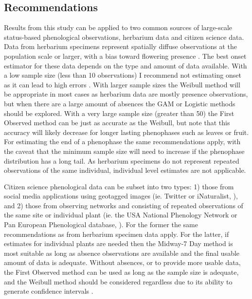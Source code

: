 \subsection{Recommendations}

Results from this study can be applied to two common sources of large-scale status-based phenological observations, herbarium data and citizen science data. Data from herbarium specimens represent spatially diffuse observations at the population scale or larger, with a bias toward flowering presence \citep{willis2017, daru2018}. The best onset estimator for these data depends on the type and amount of data available. With a low sample size (less than 10 observations) I recommend not estimating onset as it can lead to high errors \citep{miller-rushing2008, moussus2010, bertin2015}. With larger sample sizes the Weibull method will be appropriate in most cases as herbarium data are mostly presence observations, but when there are a large amount of absences the GAM or Logistic methods should be explored. With a very large sample size (greater than 50) the First Observed method can be just as accurate as the Weibull, but note that this accuracy will likely decrease for longer lasting phenophases such as leaves or fruit. For estimating the end of a phenophase the same recommendations apply, with the caveat that the minimum sample size will need to increase if the phenophase distribution has a long tail. As herbarium specimens do not represent repeated observations of the same individual, individual level estimates are not applicable. 

Citizen science phenological data can be subset into two types: 1) those from social media applications using geotagged images (ie. Twitter or iNaturalist, \cite{silva2018}), and 2) those from observing networks and consisting of repeated observations of the same site or individual plant (ie. the USA National Phenology Network or Pan European Phenological database, \cite{denny2014, templ2018}). For the former the same recommendations as from herbarium specimen data apply. For the latter, if estimates for individual plants are needed then the Midway-7 Day method is most suitable as long as absence observations are available and the final usable amount of data is adequate. Without absences, or to provide more usable data, the First Observed method can be used as long as the sample size is adequate, and the Weibull method should be considered regardless due to its ability to generate confidence intervals \citep{pearse2017}.

